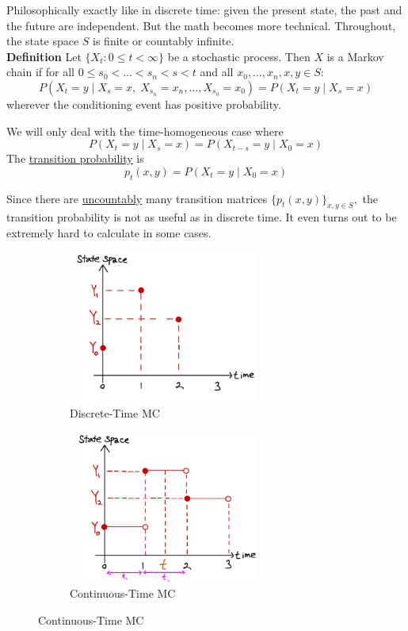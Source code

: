 \documentclass[12pt]{article}
\begin{document}
\newcommand\independent{\protect\mathpalette{\protect\independenT}{\perp}}
\def\independenT#1#2{\mathrel{\rlap{$#1#2$}\mkern2mu{#1#2}}}


Philosophically exactly like in discrete time: given the present state, the past and the future are independent. But the math becomes more technical. Throughout, the state space $S$ is finite or countably infinite.\\

{\bf Definition} Let $\{X_t:0\le t< \infty\}$ be a stochastic process. Then $X$ is a Markov chain if for all $0\le s_0<\ldots<s_n<s<t$ and all $x_0,\ldots,x_n,x,y\in S:$
$$P(X_t=y\;|\;X_s=x,\;X_{s_n}=x_n,\ldots,X_{s_0}=x_0) = P(X_t=y\;|\;X_s=x)$$ 
wherever the conditioning event has positive probability.

\vspace{1\baselineskip}
We will only deal with the time-homogeneous case where
$$P(X_t=y\;|\;X_s=x) = P(X_{t-s}=y\;|\;X_0=x)$$
The \underline{transition probability} is 
$$p_t(x,y) = P(X_t=y\;|\;X_0=x)$$

Since there are \underline{uncountably} many transition matrices $\{p_t(x,y)\}_{x,y\in S},$ the transition probability is not as useful as in discrete time. It even turns out to be extremely hard to calculate in some cases.


\begin{figure}[!htbp]
    \centering
    \begin{subfigure}[b]{0.3\textwidth}
        \includegraphics[height=5cm, width=6.5cm]{CTMC_1.jpeg}
        \caption{Discrete-Time MC}
    \end{subfigure}\qquad\qquad
    \begin{subfigure}[b]{0.3\textwidth}
        \includegraphics[height=5cm, width=6.5cm]{CTMC_2.jpeg}
        \caption{Continuous-Time MC}
    \end{subfigure}
\end{figure}
\end{document}
